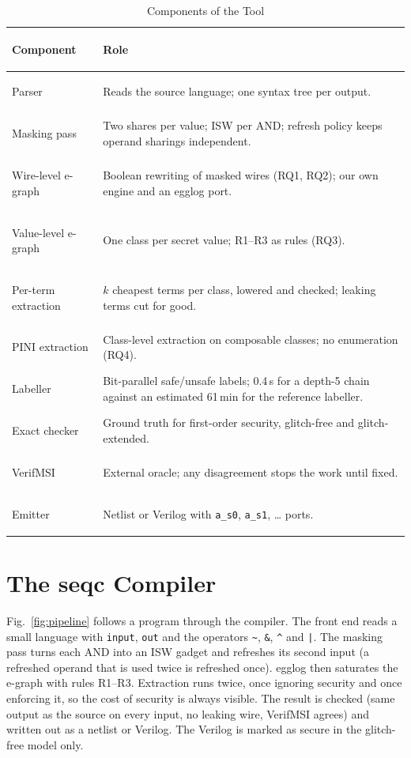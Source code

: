 \documentclass[conference]{IEEEtran}
\newcommand{\code}[1]{\texttt{\small #1}}
\begin{document}
\begin{table}[t]
\caption{Components of the Tool}\label{tab:components}
\centering\footnotesize
\begin{tabularx}{\columnwidth}{@{}>{\bfseries\raggedright\arraybackslash}p{2.5cm}>{\raggedright\arraybackslash}X@{}}
\toprule
Component & Role\\\midrule
Parser & Reads the source language; one syntax tree per output.\\
Masking pass & Two shares per value; ISW per AND; refresh policy keeps operand sharings independent.\\
Wire-level e-graph & Boolean rewriting of masked wires (RQ1, RQ2); our own engine and an egglog port.\\
Value-level e-graph & One class per secret value; R1--R3 as rules (RQ3).\\
Per-term extraction & $k$ cheapest terms per class, lowered and checked; leaking terms cut for good.\\
PINI extraction & Class-level extraction on composable classes; no enumeration (RQ4).\\
Labeller & Bit-parallel safe/unsafe labels; 0.4\,s for a depth-5 chain against an estimated 61\,min for the reference labeller.\\
Exact checker & Ground truth for first-order security, glitch-free and glitch-extended.\\
VerifMSI & External oracle; any disagreement stops the work until fixed.\\
Emitter & Netlist or Verilog with \texttt{a\_s0}, \texttt{a\_s1}, \ldots{} ports.\\
\bottomrule
\end{tabularx}
\end{table}

\section{The seqc Compiler}\label{sec:compiler}
Fig.~\ref{fig:pipeline} follows a program through the compiler. The front end reads a small language with \code{input}, \code{out} and the operators \code{\textasciitilde}, \code{\&}, \code{\textasciicircum} and \code{|}. The masking pass turns each AND into an ISW gadget and refreshes its second input (a refreshed operand that is used twice is refreshed once). egglog then saturates the e-graph with rules R1--R3. Extraction runs twice, once ignoring security and once enforcing it, so the cost of security is always visible. The result is checked (same output as the source on every input, no leaking wire, VerifMSI agrees) and written out as a netlist or Verilog. The Verilog is marked as secure in the glitch-free model only.
\end{document}
